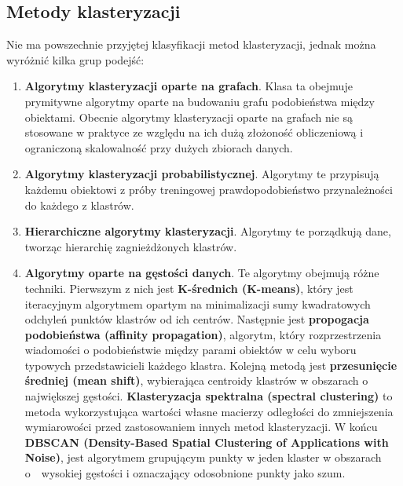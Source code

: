 	
	\subsection{Metody klasteryzacji}
		Nie ma powszechnie przyjętej klasyfikacji metod klasteryzacji, jednak można wyróżnić kilka grup podejść:

		\begin{enumerate}
			\item \textbf{Algorytmy klasteryzacji oparte na grafach}. Klasa ta obejmuje prymitywne algorytmy oparte na budowaniu grafu podobieństwa między obiektami. Obecnie algorytmy klasteryzacji oparte na grafach nie są stosowane w praktyce ze względu na ich dużą złożoność obliczeniową i ograniczoną skalowalność przy dużych zbiorach danych.
			\item \textbf{Algorytmy klasteryzacji probabilistycznej}. Algorytmy te przypisują każdemu obiektowi z próby treningowej prawdopodobieństwo przynależności do każdego z klastrów.
			\item \textbf{Hierarchiczne algorytmy klasteryzacji}. Algorytmy te porządkują dane, tworząc hierarchię zagnieżdżonych klastrów.
			\item \textbf{Algorytmy oparte na gęstości danych}. Te algorytmy obejmują różne techniki. Pierwszym z nich jest \textbf{K-średnich (K-means)}, który jest iteracyjnym algorytmem opartym na minimalizacji sumy kwadratowych odchyleń punktów klastrów od ich centrów. Następnie jest \textbf{propogacja podobieństwa (affinity propagation)}, algorytm, który rozprzestrzenia wiadomości o podobieństwie między parami obiektów w celu wyboru typowych przedstawicieli każdego klastra. Kolejną metodą jest \textbf{przesunięcie średniej (mean shift)}, wybierająca centroidy klastrów w obszarach o największej gęstości. \textbf{Klasteryzacja spektralna (spectral clustering)} to metoda wykorzystująca wartości własne macierzy odległości do zmniejszenia wymiarowości przed zastosowaniem innych metod klasteryzacji. W końcu \textbf{DBSCAN (Density-Based Spatial Clustering of Applications with Noise)}, jest algorytmem grupującym punkty w jeden klaster w obszarach o~~wysokiej gęstości i oznaczający odosobnione punkty jako szum.
		\end{enumerate}

